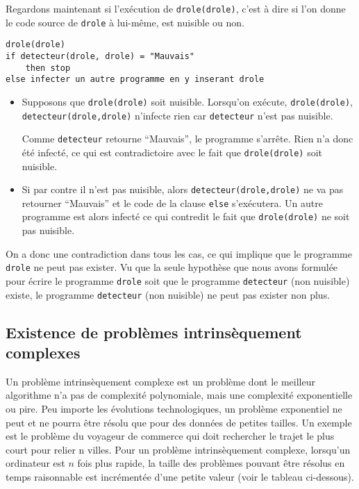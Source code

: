 Regardons maintenant si l'exécution de \lstinline|drole(drole)|, c'est à dire si l'on donne le code source de \lstinline|drole| à lui-même, est nuisible ou non.  
\begin{lstlisting}
drole(drole)
if detecteur(drole, drole) = "Mauvais"
	then stop
else infecter un autre programme en y inserant drole
\end{lstlisting}
\begin{itemize}
	\item Supposons que \lstinline|drole(drole)| soit nuisible.
      Lorsqu'on exécute, \lstinline|drole(drole)|, \\
      \lstinline|detecteur(drole,drole)| n'infecte rien car \lstinline|detecteur| n'est pas nuisible.
      
      Comme \lstinline|detecteur| retourne ``Mauvais'',
      le programme s'arrête.
      Rien n'a donc été infecté, ce qui est contradictoire avec le fait que \lstinline|drole(drole)| soit nuisible.
	\item Si par contre il n'est pas nuisible, alors \lstinline|detecteur(drole,drole)|
      ne va pas retourner ``Mauvais'' et le code de la clause \lstinline|else| s'exécutera.
      Un autre programme est alors infecté ce qui contredit le fait que \lstinline|drole(drole)| ne soit pas nuisible.
\end{itemize}

On a donc une contradiction dans tous les cas, ce qui implique que le programme \lstinline|drole| ne peut pas
exister. Vu que la seule hypothèse que nous avons formulée pour écrire le programme \lstinline|drole| soit que le programme \lstinline|detecteur| (non nuisible) existe, 
le programme \lstinline|detecteur| (non nuisible) ne peut pas exister non plus.

\subsection{ Existence de problèmes intrinsèquement complexes}
\label{subsec:existence_de_problemes_intrinsequement_complexes}

Un problème intrinsèquement complexe est un problème dont le meilleur algorithme n'a pas de complexité polynomiale, mais une complexité exponentielle ou pire.  Peu importe les évolutions technologiques, un problème exponentiel ne peut et ne pourra être résolu que pour des données de petites tailles.  Un exemple est le problème du voyageur de commerce qui doit rechercher le trajet le plus court pour relier n villes.  Pour un problème intrinsèquement complexe, lorsqu'un ordinateur est $n$ fois plus rapide,  la taille des problèmes pouvant être résolus en temps raisonnable est incrémentée d'une petite valeur (voir le tableau ci-dessous).

